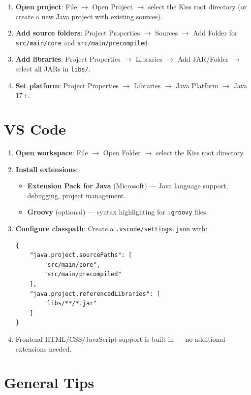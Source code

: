 \begin{enumerate}
  \item \textbf{Open project}: File $\rightarrow$ Open Project $\rightarrow$ select the Kiss root directory (or create a new Java project with existing sources).
  \item \textbf{Add source folders}: Project Properties $\rightarrow$ Sources $\rightarrow$ Add Folder for \texttt{src/main/core} and \texttt{src/main/precompiled}.
  \item \textbf{Add libraries}: Project Properties $\rightarrow$ Libraries $\rightarrow$ Add JAR/Folder $\rightarrow$ select all JARs in \texttt{libs/}.
  \item \textbf{Set platform}: Project Properties $\rightarrow$ Libraries $\rightarrow$ Java Platform $\rightarrow$ Java 17+.
\end{enumerate}

\section{VS Code}
\label{sec:ide-vscode}

\begin{enumerate}
  \item \textbf{Open workspace}: File $\rightarrow$ Open Folder $\rightarrow$ select the Kiss root directory.
  \item \textbf{Install extensions}:
  \begin{itemize}
    \item \textbf{Extension Pack for Java} (Microsoft) --- Java language support, debugging, project management.
    \item \textbf{Groovy} (optional) --- syntax highlighting for \texttt{.groovy} files.
  \end{itemize}
  \item \textbf{Configure classpath}: Create a \texttt{.vscode/settings.json} with:
  \begin{lstlisting}[style=ini]
{
    "java.project.sourcePaths": [
        "src/main/core",
        "src/main/precompiled"
    ],
    "java.project.referencedLibraries": [
        "libs/**/*.jar"
    ]
}
  \end{lstlisting}
  \item Frontend HTML/CSS/JavaScript support is built in --- no additional extensions needed.
\end{enumerate}

\section{General Tips}
\label{sec:ide-tips}

